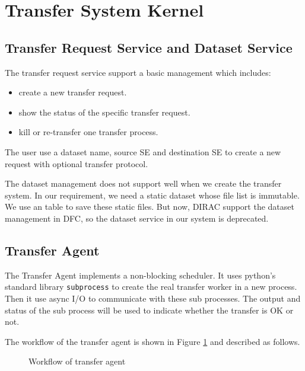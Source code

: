 \section{Transfer System Kernel}

\subsection{Transfer Request Service and Dataset Service}

The transfer request service support a basic management which includes:
\begin{itemize}
    \item create a new transfer request.
    \item show the status of the specific transfer request.
    \item kill or re-transfer one transfer process.
\end{itemize}
The user use a dataset name, source SE and destination SE to create a 
new request with optional transfer protocol.

The dataset management does not support well when we create the transfer 
system. In our requirement, we need a static dataset whose file list
is immutable. We use an table to save these static files.
But now, DIRAC support the dataset management in DFC, so the dataset
service in our system is deprecated.
\subsection{Transfer Agent}

The Transfer Agent implements a non-blocking scheduler.
It uses python's standard library {\tt subprocess} to 
create the real transfer worker in a new process.
Then it use async I/O to communicate with these sub processes.
The output and status of the sub process will be used 
to indicate whether the transfer is OK or not.

The workflow of the transfer agent is shown in Figure \ref{fig:agent}
and described as follows.
\begin{figure}
    
    \caption{Workflow of transfer agent} \label{fig:agent}
\end{figure}


